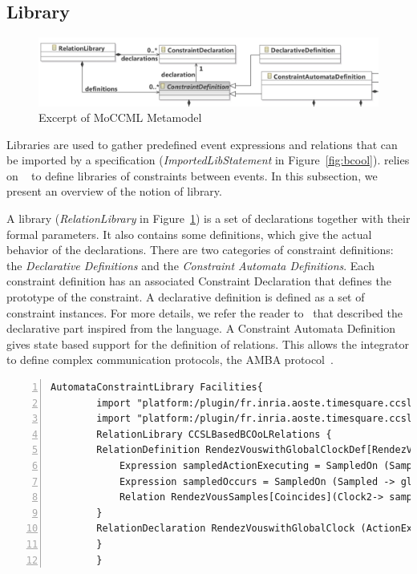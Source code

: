 \subsection{Library}
\label{subsec:bcoollib}

\begin{figure}
	\center
	\includegraphics[width=.8\textwidth]{bcool/figs/moccmlmm}
	\caption{Excerpt of MoCCML Metamodel}
	\label{fig:moccml}
\end{figure}

Libraries are used to gather predefined event expressions and relations that can be imported by a \bcool specification (\emph{ImportedLibStatement} in Figure~\ref{fig:bcool}). \bcool relies on \moccml~\cite{moccmlbib} to define libraries of constraints between events. In this subsection, we present an overview of the notion of \moccml library.

A \moccml library (\emph{RelationLibrary} in Figure~\ref{fig:moccml}) is a set of declarations together with their formal parameters. It also contains some definitions, which give the actual behavior of the declarations. There are two categories of constraint definitions: the \emph{Declarative Definitions} and the \emph{Constraint Automata Definitions}. Each constraint definition has an associated Constraint Declaration that defines the prototype of the constraint. A declarative definition is defined as a set of constraint instances. For more details, we refer the reader to~\cite{moccmloperbib} that described the declarative part inspired from the \ccsl language. A Constraint Automata Definition gives state based support for the definition of relations. This allows the integrator to define complex communication protocols, \eg the AMBA protocol~\cite{ambabus}.

\begin{lstlisting}[language=moccml,
		caption={Facilities Library in \moccml},
		label={lst:moccmllib}, 
		basicstyle=\scriptsize\ttfamily, backgroundcolor=\color{LGrey}, numbers=left, xleftmargin=2pt]
		AutomataConstraintLibrary Facilities{ 
		import "platform:/plugin/fr.inria.aoste.timesquare.ccslkernel.model/ccsllibrary/kernel.ccslLib" as kernel;
		import "platform:/plugin/fr.inria.aoste.timesquare.ccslkernel.model/ccsllibrary/CCSL.ccslLib" as CCSLLib;
		RelationLibrary CCSLBasedBCOoLRelations {
		RelationDefinition RendezVouswithGlobalClockDef[RendezVouswithGlobalClock]{ 
			Expression sampledActionExecuting = SampledOn (Sampled -> globalClock, Trigger-> ActionExecuting)
			Expression sampledOccurs = SampledOn (Sampled -> globalClock, Trigger-> FSMEventTriggering)
			Relation RendezVousSamples[Coincides](Clock2-> sampledActionExecuting , Clock1->FSMEventTriggering)
		}
		RelationDeclaration RendezVouswithGlobalClock (ActionExecuting: clock , FSMEventTriggering: clock, globalClock: clock)
		}
		}
\end{lstlisting}

